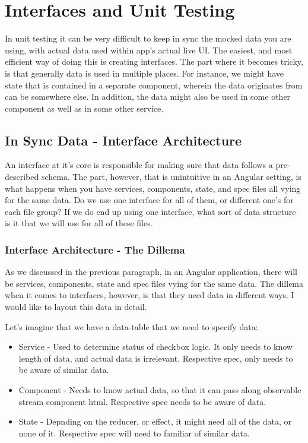 \maketitle{}
\section{ Interfaces and Unit Testing }
In unit testing it can be very difficult to keep in sync the mocked data you
are using, with actual data used within app's actual live UI. The easiest, and
most efficient way of doing this is creating interfaces. The part where it
becomes tricky, is that generally data is used in multiple places. For instance,
we might have state that is contained in a separate component, wherein the data
originates from can be somewhere else. In addition, the data might also be used
in some other component as well as in some other service.

\subsection{ In Sync Data - Interface Architecture }
An interface at it's core is responsible for making sure that data follows a
pre-described schema. The part, however, that is unintuitive in an Angular
setting, is what happens when you have services, components, state, and spec
files all vying for the same data. Do we use one interface for all of them,
or different one's for each file group? If we do end up using one interface,
what sort of data structure is it that we will use for all of these files.

\subsubsection{ Interface Architecture - The Dillema }
As we discussed in the previous paragraph, in an Angular application, there will
be services, components, state and spec files vying for the same data. The
dillema when it comes to interfaces, however, is that they need data in
different ways. I would like to layout this data in detail.

Let's imagine that we have a data-table that we need to specify data:
\begin{itemize}
  \item Service - Used to determine status of checkbox logic. It only needs to
  know length of data, and actual data is irrelevant. Respective spec, only
  needs to be aware of similar data.
  \item Component - Needs to know actual data, so that it can pass along
  observable stream component html. Respective spec needs to be aware of data.
  \item State - Depnding on the reducer, or effect, it might need all of the
  data, or none of it. Respective spec will need to familiar of similar data.
\end{itemize}

